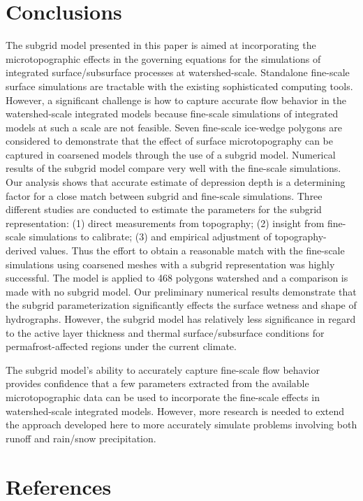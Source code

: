 \documentclass[review,11pt]{elsarticle}
\begin{document}
\section{Conclusions}\label{conclusion}

The subgrid model presented in this paper is aimed at incorporating the microtopographic effects in the governing equations for the simulations of integrated surface/subsurface processes at watershed-scale. Standalone fine-scale surface simulations are tractable with the existing sophisticated computing tools. However, a significant challenge is how to capture accurate flow behavior in the watershed-scale integrated models because fine-scale simulations of integrated models at such a scale are not feasible.
Seven fine-scale ice-wedge polygons are considered to demonstrate that the effect of surface microtopography can be captured in coarsened models through the use of a subgrid model. Numerical results of the subgrid model compare very well with the fine-scale simulations. Our analysis shows that accurate estimate of depression depth is a determining factor for a close match between subgrid and fine-scale simulations.
Three different studies are conducted to estimate the parameters for the subgrid representation: (1) direct measurements from topography; (2) insight from fine-scale simulations to calibrate; (3) and empirical adjustment of topography-derived values. 
Thus the effort to obtain a reasonable match with the fine-scale simulations using coarsened meshes with a subgrid representation was highly successful. The model is applied to 468 polygons watershed and a comparison is made with no subgrid model. Our preliminary numerical results demonstrate that the subgrid parameterization significantly effects the surface wetness and shape of hydrographs. However, the subgrid model has relatively less significance in regard to the active layer thickness and thermal surface/subsurface conditions for permafrost-affected regions under the current climate.

The subgrid model's ability to accurately capture fine-scale flow behavior provides confidence that a few parameters extracted from the available microtopographic data can be used to incorporate the fine-scale effects in watershed-scale integrated models.
However, more research is needed to extend the approach developed here to more accurately simulate problems involving both runoff and rain/snow precipitation.


\section*{References}


\end{document}
